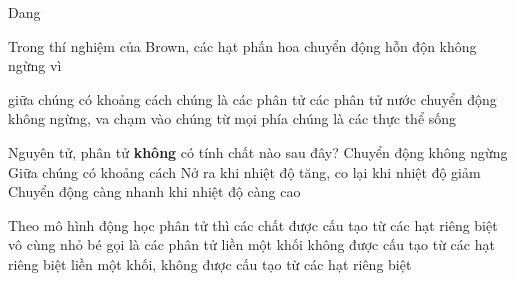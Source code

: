 \documentclass[
tuychon=HS1,
pagesize=BookA4,%
company=MAP, %
]{Class/MAPClass}
\renewcommand{\haidong}[1]{}
\begin{document}
\begin{cauhoiTN}{Dang}
\begin{ex}%
	Trong thí nghiệm của Brown, các hạt phấn hoa chuyển động hỗn độn không ngừng vì
	
	\choice
	{giữa chúng có khoảng cách}
	{chúng là các phân tử}
	{\True các phân tử nước chuyển động không ngừng, va chạm vào chúng từ mọi phía}
	{chúng là các thực thể sống}
	\haidong{3}\end{ex}
\begin{ex}%
	Nguyên tử, phân tử \textbf{không} có tính chất nào sau đây?
	\choice
	{Chuyển động không ngừng}
	{Giữa chúng có khoảng cách}
	{\True Nở ra khi nhiệt độ tăng, co lại khi nhiệt độ giảm}
	{Chuyển động càng nhanh khi nhiệt độ càng cao}
	\haidong{2}\end{ex}
\begin{ex}%
	Theo mô hình động học phân tử thì các chất
	\choice
	{\True được cấu tạo từ các hạt riêng biệt vô cùng nhỏ bé gọi là các phân tử}
	{liền một khối}
	{không được cấu tạo từ các hạt riêng biệt}
	{liền một khối, không được cấu tạo từ các hạt riêng biệt}
\end{ex}
\end{cauhoiTN}
\end{document}
